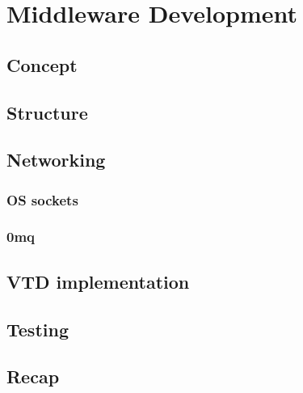 \chapter{Middleware Development}\label{ch:middleware}

\section{Concept}\label{sc:middleware:concept}

\section{Structure}\label{sc:middleware:structure}

\section{Networking}\label{sc:middleware:networking}

\subsection{OS sockets}

\subsection{0mq}

\section{VTD implementation}\label{sc:middleware:implementation}

\section{Testing}\label{sc:middleware:testing}

\section{Recap}\label{sc:middleware:recap}
